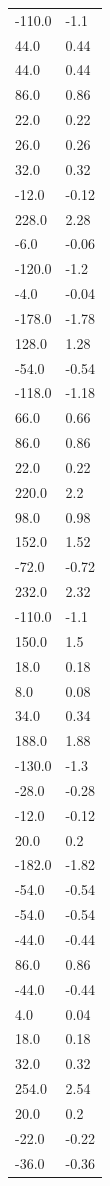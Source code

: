 \begin{longtable}{ll}
-110.0 & -1.1 \\
44.0 & 0.44 \\
44.0 & 0.44 \\
86.0 & 0.86 \\
22.0 & 0.22 \\
26.0 & 0.26 \\
32.0 & 0.32 \\
-12.0 & -0.12 \\
228.0 & 2.28 \\
-6.0 & -0.06 \\
-120.0 & -1.2 \\
-4.0 & -0.04 \\
-178.0 & -1.78 \\
128.0 & 1.28 \\
-54.0 & -0.54 \\
-118.0 & -1.18 \\
66.0 & 0.66 \\
86.0 & 0.86 \\
22.0 & 0.22 \\
220.0 & 2.2 \\
98.0 & 0.98 \\
152.0 & 1.52 \\
-72.0 & -0.72 \\
232.0 & 2.32 \\
-110.0 & -1.1 \\
150.0 & 1.5 \\
18.0 & 0.18 \\
8.0 & 0.08 \\
34.0 & 0.34 \\
188.0 & 1.88 \\
-130.0 & -1.3 \\
-28.0 & -0.28 \\
-12.0 & -0.12 \\
20.0 & 0.2 \\
-182.0 & -1.82 \\
-54.0 & -0.54 \\
-54.0 & -0.54 \\
-44.0 & -0.44 \\
86.0 & 0.86 \\
-44.0 & -0.44 \\
4.0 & 0.04 \\
18.0 & 0.18 \\
32.0 & 0.32 \\
254.0 & 2.54 \\
20.0 & 0.2 \\
-22.0 & -0.22 \\
-36.0 & -0.36 \\

\end{longtable}

